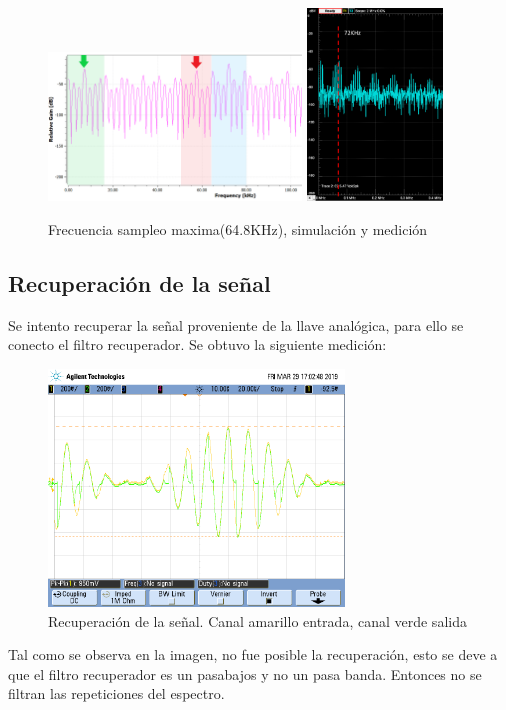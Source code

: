 \documentclass[../../ASSD_TP1_G7.tex]{subfiles}
\begin{document}
\begin{figure}[H]
\centering
{}
{\includegraphics[width=0.6\textwidth]{figures/simpto_8_syh_64,8_espectro.png}}
{\includegraphics[width=0.32\textwidth]{figures/pto_8_syh_64,8_espectro.png}}
\caption{Frecuencia sampleo maxima(64.8KHz), simulación y medición}
\label{fig:subnyq_syh_fmax}
\end{figure}

\subsection*{Recuperación de la se\~nal}
Se intento recuperar la se\~nal proveniente de la llave analógica, para ello se conecto el filtro recuperador. Se obtuvo la siguiente medición:

\begin{figure}[H]
  \centering
   \includegraphics[width=0.7\textwidth]{figures/lla_8_1.png}
  \caption{Recuperación de la se\~nal. Canal amarillo entrada, canal verde salida }
  
\end{figure}
Tal como se observa en la imagen, no fue posible la recuperación, esto se deve a que el filtro recuperador es un pasabajos y no un pasa banda. Entonces no se filtran las repeticiones del espectro.
\end{document}

